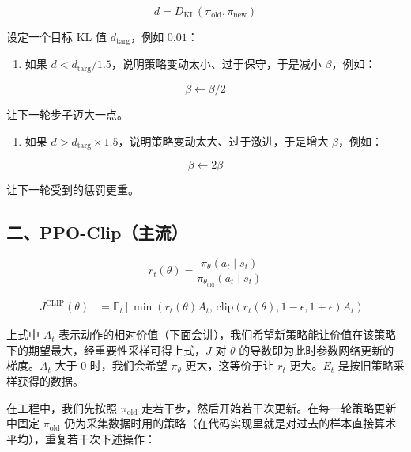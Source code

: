 \[
d = D_{\mathrm{KL}}(\pi_{\mathrm{old}},\pi_{\mathrm{new}})
\]

设定一个目标 KL 值 \(d_{\mathrm{targ}}\)，例如 \(0.01\)：

\begin{enumerate}
\def\labelenumi{\arabic{enumi}.}
\tightlist
\item
{}
  如果 \(d < d_{\mathrm{targ}}/1.5\)，说明策略变动太小、过于保守，于是减小 \(\beta\)，例如：
\end{enumerate}

\[
\beta \leftarrow \beta/2
\]

让下一轮步子迈大一点。

\begin{enumerate}
\def\labelenumi{\arabic{enumi}.}
\setcounter{enumi}{1}
\tightlist
\item
{}
  如果 \(d > d_{\mathrm{targ}}\times 1.5\)，说明策略变动太大、过于激进，于是增大 \(\beta\)，例如：
\end{enumerate}

\[
\beta \leftarrow 2\beta
\]

让下一轮受到的惩罚更重。

\hypertarget{ux4e8cppo-clipux4e3bux6d41}{%
\subsection{二、PPO-Clip（主流）}\label{ux4e8cppo-clipux4e3bux6d41}}

\[
r_t(\theta)=\frac{\pi_\theta(a_t\mid s_t)}{\pi_{\theta_{\mathrm{old}}}(a_t\mid s_t)}
\]

\[
\begin{aligned}
J^{\mathrm{CLIP}}(\theta)
&=
\mathbb{E}_t\left[
\min\left(
r_t(\theta)A_t,\,
\mathrm{clip}(r_t(\theta),1-\epsilon,1+\epsilon)A_t
\right)
\right]
\end{aligned}
\]

上式中 \(A_t\) 表示动作的相对价值（下面会讲），我们希望新策略能让价值在该策略下的期望最大，经重要性采样可得上式，\(J\) 对 \(\theta\) 的导数即为此时参数网络更新的梯度。\(A_t\) 大于 \(0\) 时，我们会希望 \(\pi_\theta\) 更大，这等价于让 \(r_t\) 更大。\(E_t\) 是按旧策略采样获得的数据。

在工程中，我们先按照 \(\pi_{\mathrm{old}}\) 走若干步，然后开始若干次更新。在每一轮策略更新中固定 \(\pi_{\mathrm{old}}\) 仍为采集数据时用的策略（在代码实现里就是对过去的样本直接算术平均），重复若干次下述操作：

